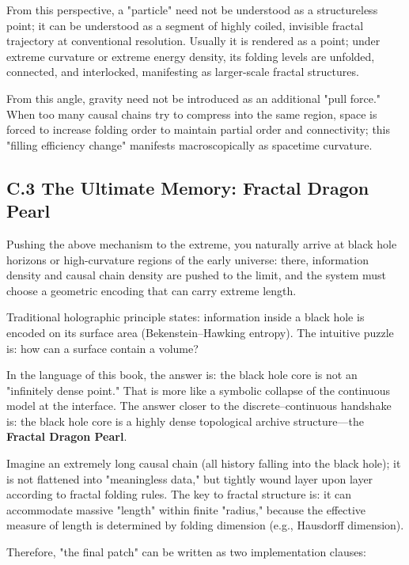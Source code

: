 From this perspective, a "particle" need not be understood as a structureless point; it can be understood as a segment of highly coiled, invisible fractal trajectory at conventional resolution. Usually it is rendered as a point; under extreme curvature or extreme energy density, its folding levels are unfolded, connected, and interlocked, manifesting as larger-scale fractal structures.

From this angle, gravity need not be introduced as an additional "pull force." When too many causal chains try to compress into the same region, space is forced to increase folding order to maintain partial order and connectivity; this "filling efficiency change" manifests macroscopically as spacetime curvature.

\subsection*{C.3 The Ultimate Memory: Fractal Dragon Pearl}

Pushing the above mechanism to the extreme, you naturally arrive at black hole horizons or high-curvature regions of the early universe: there, information density and causal chain density are pushed to the limit, and the system must choose a geometric encoding that can carry extreme length.

Traditional holographic principle states: information inside a black hole is encoded on its surface area (Bekenstein--Hawking entropy). The intuitive puzzle is: how can a surface contain a volume?

In the language of this book, the answer is: the black hole core is not an "infinitely dense point." That is more like a symbolic collapse of the continuous model at the interface. The answer closer to the discrete--continuous handshake is: the black hole core is a highly dense topological archive structure---the \textbf{Fractal Dragon Pearl}.

Imagine an extremely long causal chain (all history falling into the black hole); it is not flattened into "meaningless data," but tightly wound layer upon layer according to fractal folding rules. The key to fractal structure is: it can accommodate massive "length" within finite "radius," because the effective measure of length is determined by folding dimension (e.g., Hausdorff dimension).

Therefore, "the final patch" can be written as two implementation clauses:


